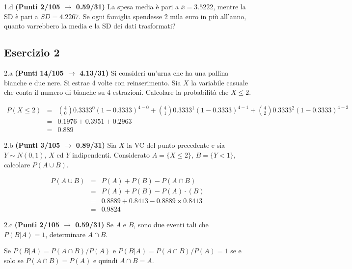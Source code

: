 \documentclass[
  11pt,
]{book}
\theoremstyle{mytheoremstyle}
\theoremstyle{mydefstyle}
\newenvironment{sol}
  {
  \begin{tcolorbox}[enhanced,breakable,arc=0.1mm,boxrule=1pt,colback=white,colframe=iblue,
  title=\bf \fontfamily{lmss}\selectfont \hspace{.5 cm} Soluzione,drop fuzzy shadow]

}{
\end{tcolorbox}
  }
\begin{document}
1.d \textbf{(Punti 2/105 \(\rightarrow\) 0.59/31)} La spesa media è pari a \(\bar x=3.5222\), mentre la SD è pari a \(SD=4.2267\).
Se ogni famiglia spendesse 2 mila euro in più all'anno, quanto varrebbero la media e la SD dei dati trasformati?

\subsection{Esercizio 2}\label{esercizio-2-38}

2.a \textbf{(Punti 14/105 \(\rightarrow\) 4.13/31)} Si consideri un'urna che ha una pallina bianche e due nere. Si estrae 4 volte con reinserimento. Sia \(X\) la variabile casuale che conta il numero di bianche su 4 estrazioni. Calcolare la probabilità che \(X\leq 2\).

\begin{sol}
\normalsize 
\begin{eqnarray*}
      P( X \leq 2 ) &=& \binom{ 4 }{ 0 } 0.3333 ^{ 0 }(1- 0.3333 )^{ 4 - 0 }+\binom{ 4 }{ 1 } 0.3333 ^{ 1 }(1- 0.3333 )^{ 4 - 1 }+\binom{ 4 }{ 2 } 0.3333 ^{ 2 }(1- 0.3333 )^{ 4 - 2 } \\                 &=& 0.1976+0.3951+0.2963 \\                 &=& 0.889 
   \end{eqnarray*}
\normalsize 

\end{sol}

2.b \textbf{(Punti 3/105 \(\rightarrow\) 0.89/31)} Sia \(X\) la VC del punto precedente e sia \(Y\sim N(0,1)\), \(X\) ed \(Y\) indipendenti. Considerato \(A=\{X\leq 2\}\), \(B=\{Y<1\}\), calcolare \(P(A\cup B)\).

\begin{sol}
\begin{eqnarray}
      P( A \cup B ) &=& P( A )+P( B )-P( A \cap B ) \\
                         &=& P( A )+P( B )-P( A )\cdot ( B ) \\
                         &=&  0.8889 + 0.8413 - 0.8889 \times 0.8413  \\
                         &=&  0.9824 \end{eqnarray}

\end{sol}

2.c \textbf{(Punti 2/105 \(\rightarrow\) 0.59/31)} Se \(A\) e \(B\), sono due eventi tali che \(P(B|A)=1\), determinare \(A\cap B\).

\begin{sol}
Se \(P(B|A)=P(A\cap B)/P(A)\) e \(P(B|A)=P(A\cap B)/P(A)=1\) se e solo se \(P(A\cap B)=P(A)\) e quindi \(A\cap B = A\).

\end{sol}
\end{document}
